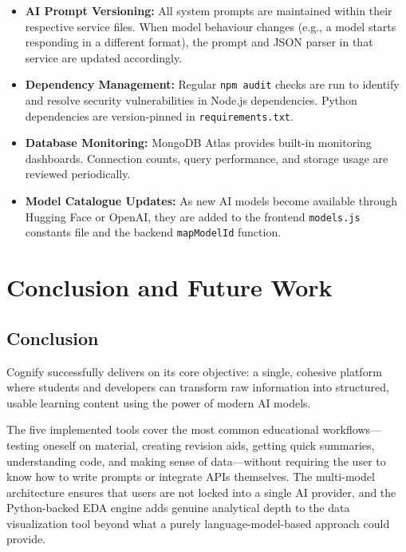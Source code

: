 \documentclass[12pt,a4paper]{article}
\begin{document}
\begin{itemize}
    \item \textbf{AI Prompt Versioning:} All system prompts are maintained within their respective service files. When model behaviour changes (e.g., a model starts responding in a different format), the prompt and JSON parser in that service are updated accordingly.
    \item \textbf{Dependency Management:} Regular \texttt{npm audit} checks are run to identify and resolve security vulnerabilities in Node.js dependencies. Python dependencies are version-pinned in \texttt{requirements.txt}.
    \item \textbf{Database Monitoring:} MongoDB Atlas provides built-in monitoring dashboards. Connection counts, query performance, and storage usage are reviewed periodically.
    \item \textbf{Model Catalogue Updates:} As new AI models become available through Hugging Face or OpenAI, they are added to the frontend \texttt{models.js} constants file and the backend \texttt{mapModelId} function.
\end{itemize}

\clearpage

\section{Conclusion and Future Work}

\subsection{Conclusion}

Cognify successfully delivers on its core objective: a single, cohesive platform where students and developers can transform raw information into structured, usable learning content using the power of modern AI models.

The five implemented tools cover the most common educational workflows—testing oneself on material, creating revision aids, getting quick summaries, understanding code, and making sense of data—without requiring the user to know how to write prompts or integrate APIs themselves. The multi-model architecture ensures that users are not locked into a single AI provider, and the Python-backed EDA engine adds genuine analytical depth to the data visualization tool beyond what a purely language-model-based approach could provide.
\end{document}
